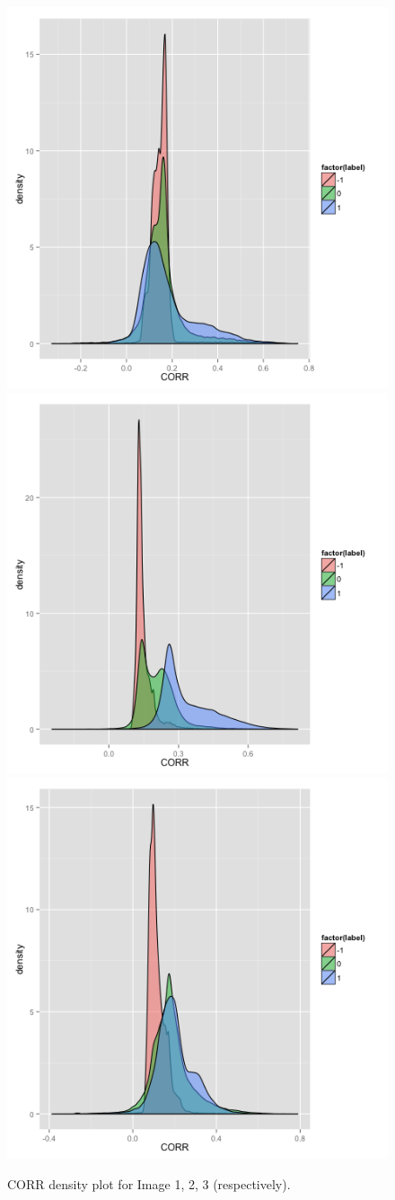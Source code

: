 \documentclass{article}\usepackage[]{graphicx}\usepackage[]{color}
\begin{document}
\begin{figure}[H]
  \includegraphics[width=\linewidth, height = 100pts]{CORR1.png}
\endminipage\hfill
{}
  \includegraphics[width=\linewidth, height = 100pts]{CORR2.png}
\endminipage\hfill
{}%
  \includegraphics[width=\linewidth, height = 100pts]{CORR3.png}
\endminipage
  \caption{CORR density plot for Image 1, 2, 3 (respectively).}\label{}
\end{figure}
\end{document}

